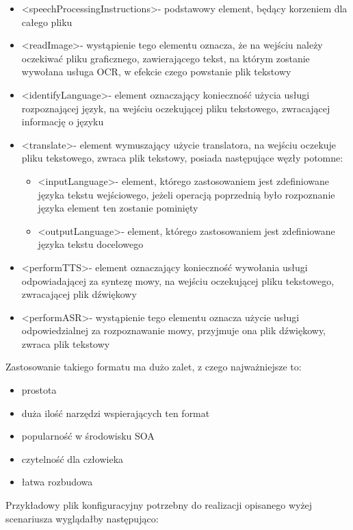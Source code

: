  \begin{itemize}
	\item \textless speechProcessingInstructions\textgreater - podstawowy element, będący korzeniem dla całego pliku
	\item \textless readImage\textgreater - wystąpienie tego elementu oznacza, że na wejściu należy oczekiwać pliku graficznego, zawierającego tekst, na którym zostanie wywołana usługa OCR, w efekcie czego powstanie plik tekstowy
	\item \textless identifyLanguage\textgreater - element oznaczający konieczność użycia usługi rozpoznającej język, na wejściu oczekującej pliku tekstowego, zwracającej informację o języku
	\item \textless translate\textgreater - element wymuszający użycie translatora, na wejściu oczekuje pliku tekstowego, zwraca plik tekstowy, posiada następujące węzły potomne:
		 \begin{itemize}
			\item \textless inputLanguage\textgreater - element, którego zastosowaniem jest zdefiniowane języka tekstu wejściowego, jeżeli operacją poprzednią  było rozpoznanie języka element ten zostanie pominięty
			\item \textless outputLanguage\textgreater - element, którego zastosowaniem jest zdefiniowane języka tekstu docelowego
		\end{itemize}
	\item \textless performTTS\textgreater - element oznaczający konieczność wywołania usługi odpowiadającej za syntezę mowy, na wejściu oczekującej pliku tekstowego, zwracającej plik dźwiękowy
	\item \textless performASR\textgreater - wystąpienie tego elementu oznacza użycie usługi odpowiedzialnej  za rozpoznawanie mowy, przyjmuje ona plik dźwiękowy, zwraca plik tekstowy
\end{itemize}
Zastosowanie takiego formatu ma dużo zalet, z czego najważniejsze to:
\begin{itemize}
	\item prostota
	\item duża ilość narzędzi wspierających ten format
	\item popularność w środowisku SOA
	\item czytelność dla człowieka
	\item łatwa rozbudowa
\end{itemize}
\newpage
Przykładowy plik konfiguracyjny potrzebny do realizacji opisanego wyżej scenariusza wyglądałby następująco:

